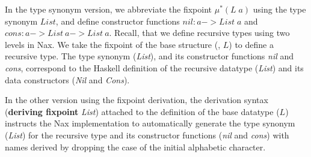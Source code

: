 In the type synonym version, we abbreviate the fixpoint $\mu^{*}(L\;a)$
using the type synonym $List$, and define constructor functions
$\textit{nil} : a -> \textit{List}\;a$ and
$\textit{cons} : a -> \textit{List}~a -> \textit{List}~a$.
Recall, that we define recursive types using two levels in Nax.  We take
the fixpoint of the base structure (\eg, $L$) to define a recursive type.
The type synonym (\textit{List}), and its constructor functions
\textit{nil} and \textit{cons}, correspond to the Haskell definition of
the recursive datatype (\textit{List}) and its data constructors
(\textit{Nil} and \textit{Cons}).

In the other version using the fixpoint derivation, the derivation syntax
(\textbf{deriving fixpoint} \textit{List}) attached to the definition of
the base datatype ($L$) instructs the Nax implementation to automatically
generate the type synonym (\textit{List}) for the recursive type and
its constructor functions (\textit{nil} and \textit{cons}) with names
derived by dropping the case of the initial alphabetic character.

